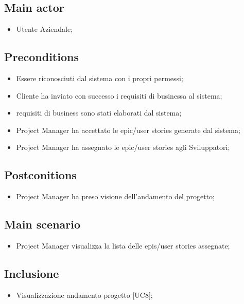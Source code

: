 \documentclass{article}
\begin{document}
    \subsection*{Main actor}
        \begin{itemize}
            \item Utente Aziendale;
        \end{itemize}
        
    \subsection*{Preconditions}
        \begin{itemize}
            \item Essere riconosciuti dal sistema con i propri permessi;
            \item Cliente ha inviato con successo i requisiti di businessa al sistema;
            \item requisiti di business sono stati elaborati dal sistema;
            \item Project Manager ha accettato le epic/user stories generate dal sistema;
            \item Project Manager ha assegnato le epic/user stories agli Sviluppatori;
        \end{itemize}
        
    \subsection*{Postconitions}
    \begin{itemize}
        \item Project Manager ha preso visione dell'andamento del progetto;
    \end{itemize}
    
    \subsection*{Main scenario}
        \begin{itemize}
            \item Project Manager visualizza la lista delle epis/user stories assegnate;
        \end{itemize}
        
    \subsection*{Inclusione}
        \begin{itemize}
            \item Visualizzazione andamento progetto [UC8];
        \end{itemize}
\end{document}
